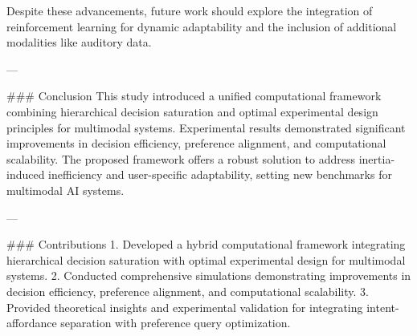 Despite these advancements, future work should explore the integration of reinforcement learning for dynamic adaptability and the inclusion of additional modalities like auditory data.

---

### Conclusion  
This study introduced a unified computational framework combining hierarchical decision saturation and optimal experimental design principles for multimodal systems. Experimental results demonstrated significant improvements in decision efficiency, preference alignment, and computational scalability. The proposed framework offers a robust solution to address inertia-induced inefficiency and user-specific adaptability, setting new benchmarks for multimodal AI systems.

---

### Contributions  
1. Developed a hybrid computational framework integrating hierarchical decision saturation with optimal experimental design for multimodal systems.  
2. Conducted comprehensive simulations demonstrating improvements in decision efficiency, preference alignment, and computational scalability.  
3. Provided theoretical insights and experimental validation for integrating intent-affordance separation with preference query optimization.  